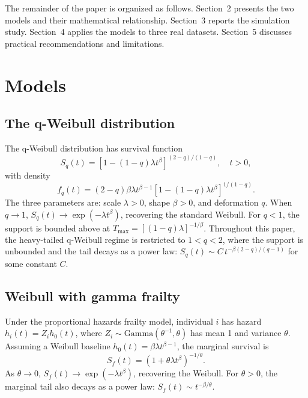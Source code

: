 \documentclass[12pt,a4paper]{article}
\begin{document}
The remainder of the paper is organized as follows. Section~2 presents the two models and their mathematical relationship. Section~3 reports the simulation study. Section~4 applies the models to three real datasets. Section~5 discusses practical recommendations and limitations.

\section{Models}

\subsection{The q-Weibull distribution}

The q-Weibull distribution \citep{picoli2003q} has survival function
\begin{equation}
S_q(t) = \left[1-(1-q)\lambda t^\beta\right]^{(2-q)/(1-q)}, \quad t>0,
\end{equation}
with density
\begin{equation}
f_q(t) = (2-q)\beta\lambda t^{\beta-1}\left[1-(1-q)\lambda t^\beta\right]^{1/(1-q)}.
\end{equation}
The three parameters are: scale $\lambda>0$, shape $\beta>0$, and deformation $q$. When $q\to 1$, $S_q(t)\to\exp(-\lambda t^\beta)$, recovering the standard Weibull. For $q<1$, the support is bounded above at $T_{\max}=[(1-q)\lambda]^{-1/\beta}$. Throughout this paper, the heavy-tailed q-Weibull regime is restricted to $1<q<2$, where the support is unbounded and the tail decays as a power law: $S_q(t)\sim C\,t^{-\beta(2-q)/(q-1)}$ for some constant $C$.

\subsection{Weibull with gamma frailty}

Under the proportional hazards frailty model, individual $i$ has hazard $h_i(t)=Z_i h_0(t)$, where $Z_i\sim\mathrm{Gamma}(\theta^{-1},\theta)$ has mean 1 and variance $\theta$. Assuming a Weibull baseline $h_0(t)=\beta\lambda t^{\beta-1}$, the marginal survival is
\begin{equation}
S_f(t) = \left(1+\theta\lambda t^\beta\right)^{-1/\theta}.
\end{equation}
As $\theta\to 0$, $S_f(t)\to\exp(-\lambda t^\beta)$, recovering the Weibull. For $\theta>0$, the marginal tail also decays as a power law: $S_f(t)\sim t^{-\beta/\theta}$.
\end{document}
